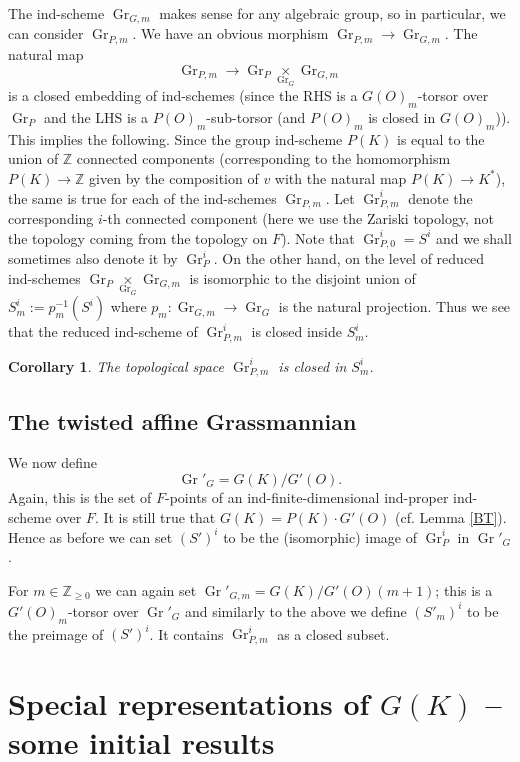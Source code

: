 \documentclass[11pt,a4paper,twoside]{amsart}
\newtheorem{corollary}[theorem]{Corollary}
\theoremstyle{definition}
\theoremstyle{remark}
\newcommand{\Gr}{\operatorname{Gr}}
\begin{document}
The ind-scheme $\Gr_{G,m}$ makes sense for any algebraic group, so in particular, we can consider $\Gr_{P,m}$. We have an obvious morphism $\Gr_{P,m}\to \Gr_{G,m}$.
The natural map
$$
\Gr_{P,m}\to \Gr_P\underset{\Gr_G}\times \Gr_{G,m}
$$
is a closed embedding of ind-schemes (since the RHS is a $G(O)_m$-torsor over $\Gr_P$ and the LHS is a $P(O)_m$-sub-torsor (and $P(O)_m$ is closed in $G(O)_m$)). This implies the following. Since the group ind-scheme $P(K)$ is equal to the union of $\mathbb Z$ connected components (corresponding to the homomorphism $P(K)\to \mathbb Z$ given by the composition of $v$ with the natural map $P(K)\to K^*$), the same is true for each of the ind-schemes $\Gr_{P,m}$. Let $\Gr_{P,m}^i$ denote the corresponding $i$-th connected component (here we use the Zariski topology, not the topology coming from the topology on $F$). Note that $\Gr_{P,0}^i=S^i$ and we shall sometimes also denote it by $\Gr_P^i$. On the other hand, on the level of reduced ind-schemes $\Gr_P\underset{\Gr_G}\times \Gr_{G,m}$ is isomorphic to the disjoint union of $S^i_m:=p_m^{-1}(S^i)$ where $p_m:\Gr_{G,m}\to \Gr_G$ is the natural projection. Thus we see that
the reduced ind-scheme of $\Gr_{P,m}^i$ is closed inside $S^i_m$.
\begin{corollary}
The topological space $\Gr_{P,m}^i$ is closed in $S^i_m$.
\end{corollary}

\subsection{The twisted affine Grassmannian}We now define
$$
\Gr'_G=G(K)/G'(O).
$$
 Again, this is the set of $F$-points of an ind-finite-dimensional ind-proper ind-scheme over $F$. It is still true that $G(K)=P(K)\cdot G'(O)$ (cf. Lemma \ref{BT}). Hence as before we can set $(S')^i$ to be the (isomorphic) image of $\Gr_P^i$ in $\Gr'_G$.

For $m\in \mathbb Z_{\geq 0}$ we can again set $\Gr'_{G,m}=G(K)/G'(O)(m+1)$; this is a $G'(O)_m$-torsor over $\Gr'_G$ and similarly to the above we define $(S'_m)^i$ to be the preimage of $(S')^i$. It contains $\Gr_{P,m}^i$ as a closed subset.

\section{Special representations of $G(K)$ -- some initial results}\label{G(K)-in}
\end{document}

